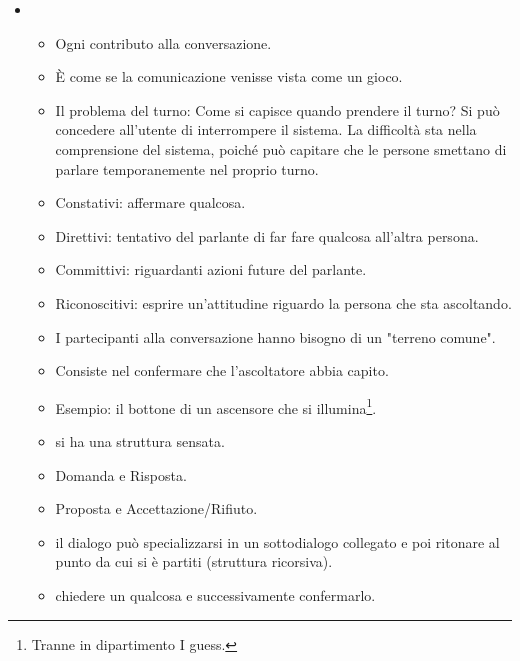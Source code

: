 \begin{itemize}
  \item {} 
    \begin{itemize}
      \item Ogni contributo alla conversazione. 
      \item È come se la comunicazione venisse vista come un gioco.  
      \item Il problema del turno: Come si capisce quando prendere il turno? Si può concedere all'utente di interrompere il sistema. La difficoltà sta nella comprensione del sistema, poiché può capitare che le persone smettano di parlare temporanemente nel proprio turno.
    \end{itemize}
    \begin{itemize}
      \item Constativi: affermare qualcosa.
      \item Direttivi: tentativo del parlante di far fare qualcosa all'altra persona.
      \item Committivi: riguardanti azioni future del parlante.
      \item Riconoscitivi: esprire un'attitudine riguardo la persona che sta ascoltando.
    \end{itemize}
    \begin{itemize}
      \item I partecipanti alla conversazione hanno bisogno di un "terreno comune". 
      \item Consiste nel confermare che l'ascoltatore abbia capito. 
      \item Esempio: il bottone di un ascensore che si illumina\footnote{Tranne in dipartimento I guess.}.
    \end{itemize}
    \begin{itemize}
      \item {} si ha una struttura sensata. 
      \item Domanda e Risposta. 
      \item Proposta e Accettazione/Rifiuto.
    \item {} il dialogo può specializzarsi in un sottodialogo collegato e poi ritonare al punto da cui si è partiti (struttura ricorsiva). 
    \item {} chiedere un qualcosa e successivamente confermarlo.
    \end{itemize}

\end{itemize}
